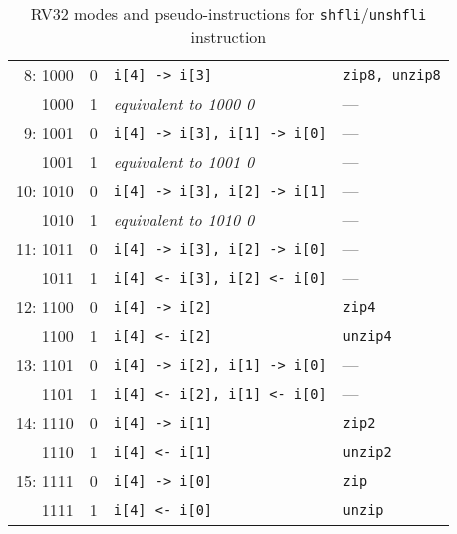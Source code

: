 \begin{table}[h]
\begin{small}
\begin{center}
\begin{tabular}{r c l l}
\hline

 8: 1000 & 0 & {\tt i[4] -> i[3]}               & {\tt zip8, unzip8}     \\
    1000 & 1 & {\it equivalent to 1000 0}       & ---                    \\
 9: 1001 & 0 & {\tt i[4] -> i[3], i[1] -> i[0]} & ---                    \\
    1001 & 1 & {\it equivalent to 1001 0}       & ---                    \\
10: 1010 & 0 & {\tt i[4] -> i[3], i[2] -> i[1]} & ---                    \\
    1010 & 1 & {\it equivalent to 1010 0}       & ---                    \\
11: 1011 & 0 & {\tt i[4] -> i[3], i[2] -> i[0]} & ---                    \\
    1011 & 1 & {\tt i[4] <- i[3], i[2] <- i[0]} & ---                    \\

\hline

12: 1100 & 0 & {\tt i[4] -> i[2]}               & {\tt zip4}             \\
    1100 & 1 & {\tt i[4] <- i[2]}               & {\tt unzip4}           \\
13: 1101 & 0 & {\tt i[4] -> i[2], i[1] -> i[0]} & ---                    \\
    1101 & 1 & {\tt i[4] <- i[2], i[1] <- i[0]} & ---                    \\
14: 1110 & 0 & {\tt i[4] -> i[1]}               & {\tt zip2}             \\
    1110 & 1 & {\tt i[4] <- i[1]}               & {\tt unzip2}           \\
15: 1111 & 0 & {\tt i[4] -> i[0]}               & {\tt zip}              \\
    1111 & 1 & {\tt i[4] <- i[0]}               & {\tt unzip}            \\

\end{tabular}
\end{center}
\end{small}
\caption{RV32 modes and pseudo-instructions for {\tt shfli}/{\tt unshfli} instruction}
\label{gzip32-modes}
\end{table}


